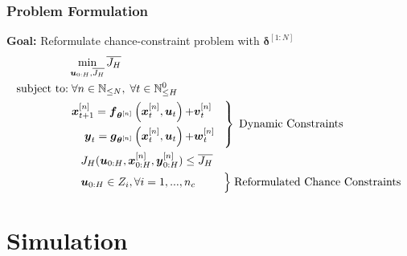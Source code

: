 \documentclass[student, noshadow, itr, english, aspectratio=169]{ITR_LSR_slides}
\begin{document}
\begin{frame}
	\frametitle{Problem Formulation}
\textbf{Goal:} Reformulate chance-constraint problem with $\boldsymbol{\delta}^{[1:N]}$ \\
\begin{align*} 
 &\min\limits_{\boldsymbol{u}_{0:H}, \overline{J_H}}  \overline{J_H}\\
\text{subject to:}&\; \forall n \in \mathbb{N}_{\leq N}, \;  \forall t \in \mathbb{N}_{\leq H}^0  \\
&\left. 
\begin {aligned}
\boldsymbol{x}_{t+1}^{[n]} = \boldsymbol{f}_{\boldsymbol{\theta}^{[n]}} \left( \boldsymbol{x}_{t}^{[n]} , \boldsymbol{u}_t \right) + & \boldsymbol{v}_{t}^{[n]} \\
\boldsymbol{y}_{t} = \boldsymbol{g}_{\boldsymbol{\theta}^{[n]}} \left( \boldsymbol{x}_{t}^{[n]}, \boldsymbol{u}_t \right) + & \boldsymbol{w}_{t}^{[n]}
\end{aligned}
 \;\;\; \right\} \; \text{Dynamic Constraints} \\
&\;\;\;\; J_H(\boldsymbol{u}_{0:H},  \boldsymbol{x}_{0:H}^{[n]},  \boldsymbol{y}_{0:H}^{[n]})  \leq \overline{J_H} \\
&\;\;\;\; \boldsymbol{u}_{0:H} \in Z_i, \forall i = 1, ...,n_c \;\;\;\;\;\;\;\;\; \Bigl\} \; \text{Reformulated Chance Constraints}
\end{align*}



\end{frame}

\section{Simulation}
\end{document}
